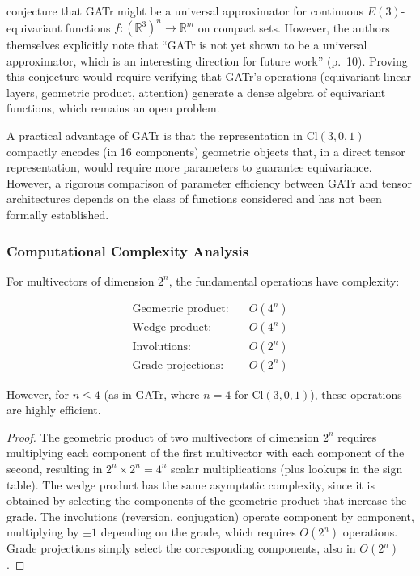 \begin{remark}\label{rem:aproximacion_universal_clifford}
\citet{brehmer2023geometric} conjecture that GATr might be a universal approximator for continuous $E(3)$-equivariant functions $f: (\mathbb{R}^3)^n \to \mathbb{R}^m$ on compact sets. However, the authors themselves explicitly note that ``GATr is not yet shown to be a universal approximator, which is an interesting direction for future work'' (p.~10). Proving this conjecture would require verifying that GATr's operations (equivariant linear layers, geometric product, attention) generate a dense algebra of equivariant functions, which remains an open problem.
\end{remark}

\begin{remark}\label{cor:eficiencia_parametrica_clifford}
A practical advantage of GATr is that the representation in $\text{Cl}(3,0,1)$ compactly encodes (in 16 components) geometric objects that, in a direct tensor representation, would require more parameters to guarantee equivariance. However, a rigorous comparison of parameter efficiency between GATr and tensor architectures depends on the class of functions considered and has not been formally established.
\end{remark}

\subsubsection{Computational Complexity Analysis}

\begin{proposition}\label{prop:complejidad_clifford}
For multivectors of dimension $2^n$, the fundamental operations have complexity:

\begin{align}
    \text{Geometric product:} &\quad O(4^n) \\
    \text{Wedge product:} &\quad O(4^n) \\
    \text{Involutions:} &\quad O(2^n) \\
    \text{Grade projections:} &\quad O(2^n)
\end{align}

However, for $n \leq 4$ (as in GATr, where $n = 4$ for $\text{Cl}(3,0,1)$), these operations are highly efficient.
\end{proposition}

\begin{proof}
The geometric product of two multivectors of dimension $2^n$ requires multiplying each component of the first multivector with each component of the second, resulting in $2^n \times 2^n = 4^n$ scalar multiplications (plus lookups in the sign table). The wedge product has the same asymptotic complexity, since it is obtained by selecting the components of the geometric product that increase the grade. The involutions (reversion, conjugation) operate component by component, multiplying by $\pm 1$ depending on the grade, which requires $O(2^n)$ operations. Grade projections simply select the corresponding components, also in $O(2^n)$.
\end{proof}

